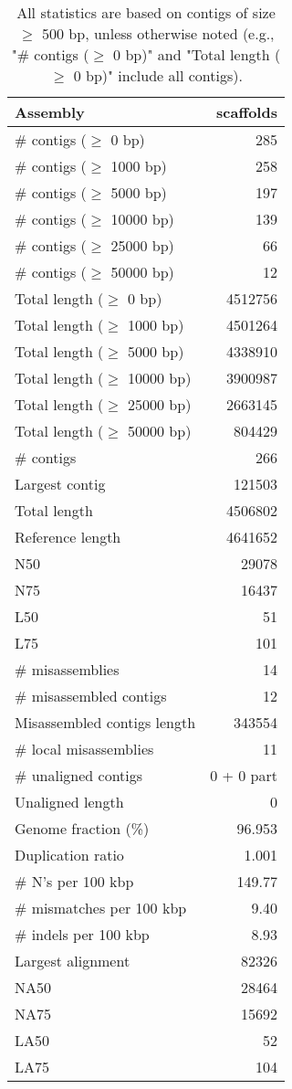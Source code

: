 \documentclass[12pt,a4paper]{article}
\begin{document}
\begin{table}[ht]
\begin{center}
\caption{All statistics are based on contigs of size $\geq$ 500 bp, unless otherwise noted (e.g., "\# contigs ($\geq$ 0 bp)" and "Total length ($\geq$ 0 bp)" include all contigs).}
\begin{tabular}{|l*{1}{|r}|}
\hline
Assembly & scaffolds \\ \hline
\# contigs ($\geq$ 0 bp) & 285 \\ \hline
\# contigs ($\geq$ 1000 bp) & 258 \\ \hline
\# contigs ($\geq$ 5000 bp) & 197 \\ \hline
\# contigs ($\geq$ 10000 bp) & 139 \\ \hline
\# contigs ($\geq$ 25000 bp) & 66 \\ \hline
\# contigs ($\geq$ 50000 bp) & 12 \\ \hline
Total length ($\geq$ 0 bp) & 4512756 \\ \hline
Total length ($\geq$ 1000 bp) & 4501264 \\ \hline
Total length ($\geq$ 5000 bp) & 4338910 \\ \hline
Total length ($\geq$ 10000 bp) & 3900987 \\ \hline
Total length ($\geq$ 25000 bp) & 2663145 \\ \hline
Total length ($\geq$ 50000 bp) & 804429 \\ \hline
\# contigs & 266 \\ \hline
Largest contig & 121503 \\ \hline
Total length & 4506802 \\ \hline
Reference length & 4641652 \\ \hline
N50 & 29078 \\ \hline
N75 & 16437 \\ \hline
L50 & 51 \\ \hline
L75 & 101 \\ \hline
\# misassemblies & 14 \\ \hline
\# misassembled contigs & 12 \\ \hline
Misassembled contigs length & 343554 \\ \hline
\# local misassemblies & 11 \\ \hline
\# unaligned contigs & 0 + 0 part \\ \hline
Unaligned length & 0 \\ \hline
Genome fraction (\%) & 96.953 \\ \hline
Duplication ratio & 1.001 \\ \hline
\# N's per 100 kbp & 149.77 \\ \hline
\# mismatches per 100 kbp & 9.40 \\ \hline
\# indels per 100 kbp & 8.93 \\ \hline
Largest alignment & 82326 \\ \hline
NA50 & 28464 \\ \hline
NA75 & 15692 \\ \hline
LA50 & 52 \\ \hline
LA75 & 104 \\ \hline
\end{tabular}
\end{center}
\end{table}
\end{document}
